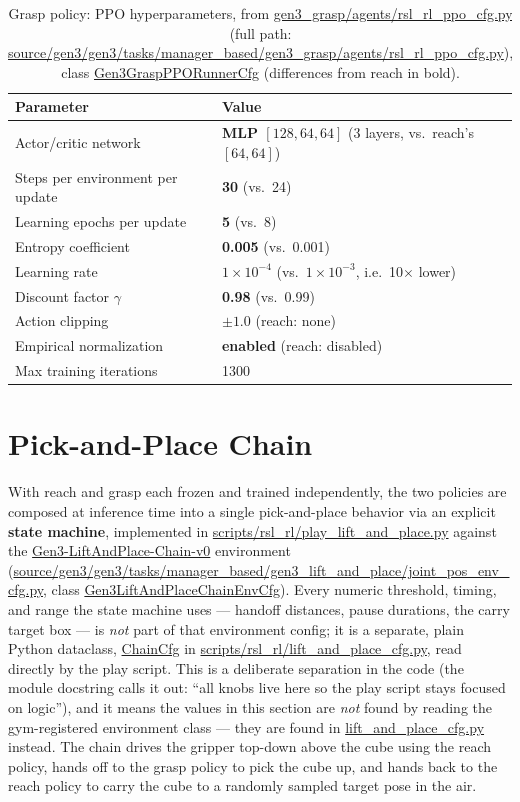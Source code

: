 \documentclass[11pt]{article}
\begin{document}
\begin{table}[h]
\centering
\caption{Grasp policy: PPO hyperparameters, from
\url{gen3_grasp/agents/rsl_rl_ppo_cfg.py} (full path:
\url{source/gen3/gen3/tasks/manager_based/gen3_grasp/agents/rsl_rl_ppo_cfg.py}),
class \url{Gen3GraspPPORunnerCfg} (differences from reach in bold).}
\label{tab:grasp_ppo}
\begin{tabular}{ll}
\toprule
Parameter & Value \\
\midrule
Actor/critic network & \textbf{MLP $[128, 64, 64]$} (3 layers, vs.\ reach's $[64,64]$) \\
Steps per environment per update & \textbf{30} (vs.\ 24) \\
Learning epochs per update & \textbf{5} (vs.\ 8) \\
Entropy coefficient & \textbf{0.005} (vs.\ 0.001) \\
Learning rate & \textbf{$1\times10^{-4}$} (vs.\ $1\times10^{-3}$, i.e.\ 10$\times$ lower) \\
Discount factor $\gamma$ & \textbf{0.98} (vs.\ 0.99) \\
Action clipping & \textbf{$\pm1.0$} (reach: none) \\
Empirical normalization & \textbf{enabled} (reach: disabled) \\
Max training iterations & 1300 \\
\bottomrule
\end{tabular}
\end{table}

\section{Pick-and-Place Chain}
\label{sec:chain}

With reach and grasp each frozen and trained independently, the two policies are
composed at inference time into a single pick-and-place behavior via an explicit
\textbf{state machine}, implemented in \url{scripts/rsl_rl/play_lift_and_place.py}
against the \url{Gen3-LiftAndPlace-Chain-v0} environment
(\url{source/gen3/gen3/tasks/manager_based/gen3_lift_and_place/joint_pos_env_cfg.py},
class \url{Gen3LiftAndPlaceChainEnvCfg}). Every numeric threshold, timing, and
range the state machine uses --- handoff distances, pause durations, the carry
target box --- is \emph{not} part of that environment config; it is a separate,
plain Python dataclass, \url{ChainCfg} in
\url{scripts/rsl_rl/lift_and_place_cfg.py}, read directly by the play script.
This is a deliberate separation in the code (the module docstring calls it out: ``all
knobs live here so the play script stays focused on logic''), and it means the
values in this section are \emph{not} found by reading the gym-registered
environment class --- they are found in \url{lift_and_place_cfg.py} instead.
The chain drives the
gripper top-down above the cube using the reach policy, hands off to the grasp
policy to pick the cube up, and hands back to the reach policy to carry the cube to
a randomly sampled target pose in the air.
\end{document}
